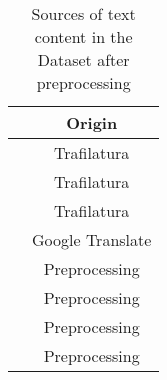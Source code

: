 \begin{table}%
    \centering
    \begin{tabular}{c|c}
       \textbf{\contentType{}}  & \textbf{Origin} \\ \hline
       \trafilaturaTitle{}  & Trafilatura \\
       \trafilaturaAbstract{}  & Trafilatura \\
       \trafilaturaFulltext{}  & Trafilatura \\
       \translationTitle{}  & Google Translate \\
     \keyphrasesAbstractOnly{} & Preprocessing \\
     \keyphrasesAbstractOC{} & Preprocessing \\
     \keyphrasesFulltextOnly{} & Preprocessing \\
     \keyphrasesFulltextOC{} & Preprocessing \\ \hline
    \end{tabular}
    \caption{Sources of text content in the \VSI{} Dataset after preprocessing}
    \label{tab:05_pesv_sources of content after preprocessing}
\end{table}